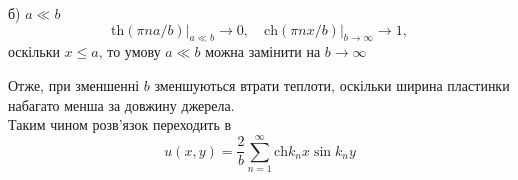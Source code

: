 б) $a \ll b$
\begin{equation*}
    \mathrm{th}(\pi na/b)\bigg|_{a \ll b} \to 0, \quad \mathrm{ch}(\pi nx/b)\bigg|_{b\to\infty} \to 1,
\end{equation*}
оскільки $x \leq a$, то умову $a \ll b$ можна замінити на $b\to\infty$

Отже, при зменшенні $b$ зменшуються втрати теплоти, оскільки ширина пластинки набагато менша за довжину джерела.\\
Таким чином розв'язок переходить в 
\begin{equation}
    u(x,y) = \frac{2}{b}\sum_{n=1}^{\infty} \mathrm{ch}k_nx\sin k_ny
\end{equation}

%